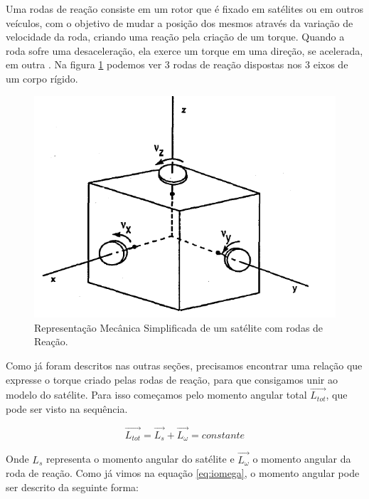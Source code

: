 Uma rodas de reação consiste em um rotor que é fixado em satélites ou em outros veículos, com o objetivo de mudar a posição dos mesmos através da variação de velocidade da roda, criando uma reação pela criação de um torque. Quando a roda sofre uma desaceleração, ela exerce um torque em uma direção, se acelerada, em outra \cite{BongWie2001}. Na figura \ref{fig:satellite_controlhand_p1306} podemos ver 3 rodas de reação dispostas nos 3 eixos de um corpo rígido.

\begin{figure}[!ht]
  \caption{Representação Mecânica Simplificada de um satélite com rodas de Reação.}
  \begin{center}
      \includegraphics[scale=0.75]{img/satellite_controlhand_p1306}
  \end{center}
  \label{fig:satellite_controlhand_p1306}
\end{figure}

Como já foram descritos nas outras seções, precisamos encontrar uma relação que expresse o torque criado pelas rodas de reação, para que consigamos unir ao modelo do satélite. Para isso começamos pelo momento angular total $\vec{L_{tot}}$, que pode ser visto na sequência.

\begin{equation}\label{eq:ltot}
\vec{L_{tot}}=\vec{L_s}+\vec{L_{\omega}}=constante 
\end{equation}

Onde $L_s$ representa o momento angular do satélite e $\vec{L_{\omega}}$ o momento angular da roda de reação. Como já vimos na equação \ref{eq:iomega}, o momento angular pode ser descrito da seguinte forma:

